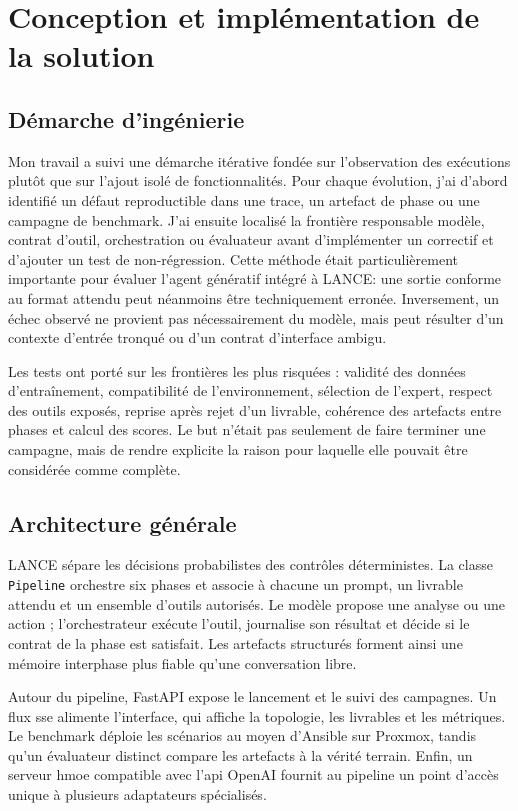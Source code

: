 \chapter{Conception et implémentation de la solution}
\label{chap:implementation}

\section{Démarche d'ingénierie}

Mon travail a suivi une démarche itérative fondée sur l'observation des
exécutions plutôt que sur l'ajout isolé de fonctionnalités. Pour chaque
évolution, j'ai d'abord identifié un défaut reproductible dans une trace, un
artefact de phase ou une campagne de benchmark. J'ai ensuite localisé la
frontière responsable modèle, contrat d'outil, orchestration ou évaluateur avant d'implémenter un correctif et d'ajouter un test de non-régression.
Cette méthode était particulièrement importante pour évaluer l’agent génératif intégré à LANCE: une sortie conforme au format attendu peut néanmoins être techniquement erronée. Inversement, un échec observé ne provient pas nécessairement du modèle, mais peut résulter d’un contexte d’entrée tronqué ou d’un contrat d’interface ambigu.


Les tests ont porté sur les frontières les plus risquées : validité des données
d'entraînement, compatibilité de l'environnement, sélection de l'expert,
respect des outils exposés, reprise après rejet d'un livrable, cohérence des
artefacts entre phases et calcul des scores. Le but n'était pas seulement de
faire terminer une campagne, mais de rendre explicite la raison pour laquelle
elle pouvait être considérée comme complète.

\section{Architecture générale}

LANCE sépare les décisions probabilistes des contrôles déterministes. La classe
\texttt{\footnotesize Pipeline} orchestre six phases et associe à chacune un prompt, un
livrable attendu et un ensemble d'outils autorisés. Le modèle propose une
analyse ou une action ; l'orchestrateur exécute l'outil, journalise son résultat
et décide si le contrat de la phase est satisfait. Les artefacts structurés
forment ainsi une mémoire interphase plus fiable qu'une conversation libre.

Autour du pipeline, FastAPI expose le lancement et le suivi des campagnes. Un
flux \gls{sse} alimente l'interface, qui affiche la topologie, les livrables et
les métriques. Le benchmark déploie les scénarios au moyen d'Ansible sur
Proxmox, tandis qu'un évaluateur distinct compare les artefacts à la vérité terrain.
Enfin, un serveur \gls{hmoe} compatible avec l'\gls{api} OpenAI fournit au pipeline un point
d'accès unique à plusieurs adaptateurs spécialisés.

